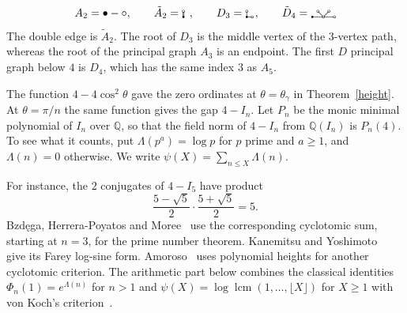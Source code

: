\documentclass[11pt,a4paper]{article}
\begin{document}
\[
A_2=\bullet-\circ,\qquad \tilde{A}_2=\hbox{\raisebox{-0.7mm}{\begin{picture}(7,8)(-1.5,-1.5)
\put(-0.46,0.64){\line(0,1){3.72}}
\put(0.46,0.64){\line(0,1){3.72}}
\put(0,5){\circle{1.6}}
\put(0,0){\circle*{1.6}}
\end{picture}}},\qquad D_3=\hbox{\raisebox{-0.7mm}{\begin{picture}(9,8)(-1.5,-1.5)
\put(0,4.2){\line(0,-1){3.4}}
\put(0.8,0){\line(1,0){3.4}}
\put(0,5){\circle{1.6}}
\put(0,0){\circle*{1.6}}
\put(5,0){\circle{1.6}}
\end{picture}}},\qquad \tilde{D}_4=\hbox{\raisebox{-0.7mm}{\begin{picture}(23,8)(-1.5,-1.5)
\put(0.8,0){\line(1,0){8.4}}
\put(10.8,0){\line(1,0){8.4}}
\qbezier(5.56569,4.43431)(7.5,2.5)(9.43431,0.565685)
\qbezier(14.4343,4.43431)(12.5,2.5)(10.5657,0.565685)
\put(5,5){\circle{1.6}}
\put(15,5){\circle{1.6}}
\put(0,0){\circle*{1.6}}
\put(10,0){\circle{1.6}}
\put(20,0){\circle{1.6}}
\end{picture}}}
\]
\endgroup
The double edge is $\tilde A_2$. The root of $D_3$ is the middle vertex of the $3$-vertex path, whereas the root of the principal graph $A_3$ is an endpoint. The first $D$ principal graph below $4$ is $D_4$, which has the same index $3$ as $A_5$.

The function $4-4\cos^2\theta$ gave the zero ordinates at $\theta=\theta_\gamma$ in Theorem~\ref{height}. At $\theta=\pi/n$ the same function gives the gap $4-I_n$. Let $P_n$ be the monic minimal polynomial of $I_n$ over $\mathbb Q$, so that the field norm of $4-I_n$ from $\mathbb Q(I_n)$ is $P_n(4)$. To see what it counts, put $\Lambda(p^a)=\log p$ for $p$ prime and $a\geq1$, and $\Lambda(n)=0$ otherwise. We write $\psi(X)=\sum_{n\leq X}\Lambda(n)$.

For instance, the $2$ conjugates of $4-I_5$ have product
\[
 \frac{5-\sqrt5}{2}\cdot\frac{5+\sqrt5}{2}=5 .
\]
Bzd\k{e}ga, Herrera-Poyatos and Moree~\cite{bhm} use the corresponding cyclotomic sum, starting at $n=3$, for the prime number theorem. Kanemitsu and Yoshimoto~\cite{ky-euler} give its Farey log-sine form. Amoroso~\cite{amoroso95} uses polynomial heights for another cyclotomic criterion. The arithmetic part below combines the classical identities $\Phi_n(1)=e^{\Lambda(n)}$ for $n>1$ and $\psi(X)=\log\operatorname{lcm}(1,\ldots,\lfloor X\rfloor)$ for $X\geq1$ with von Koch's criterion~\cite{koch}.
\end{document}
